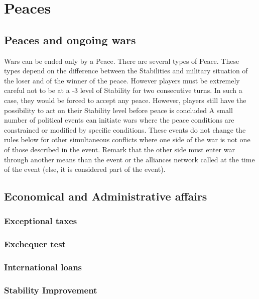 
\chapter{Peaces}\label{chapter:Peace}

\section{Peaces and ongoing wars}

\aparag Wars can be ended only by a Peace. There are several types of
Peace. These types depend on the difference between the Stabilities and
military situation of the loser and of the winner of the peace. However
players must be extremely careful not to be at a -3 level of Stability for two
consecutive turns. In such a case, they would be forced to accept any
peace. However, players still have the possibility to act on their Stability
level before peace is concluded
 A small number of political
events can initiate wars where the peace conditions are constrained or
modified by specific conditions. These events do not change the rules below
for other simultaneous conflicts where one side of the war is not one of those
described in the event.
\bparag Remark that the other side must enter war through another means than
the event or the alliances network called at the time of the event (else, it
is considered part of the event).

\PeaceDetails

\section{Economical and Administrative affairs}
\subsection{Exceptional taxes}\label{chPeace:Exceptional taxes}
\subsection{Exchequer test}\label{chPeace:Exchequer test}
\subsection{International loans}\label{chPeace:International loans}
\subsection{Stability Improvement}\label{chPeace:Stability Improvement}

